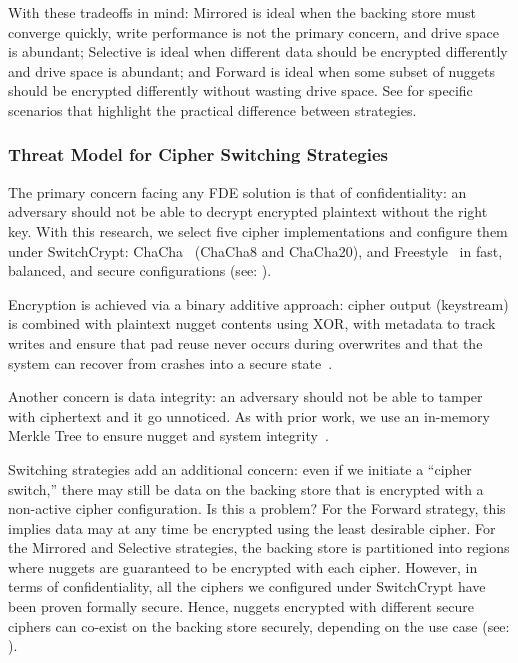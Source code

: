 With these tradeoffs in mind: Mirrored is ideal when the backing store must
converge quickly, write performance is not the primary concern, and drive space
is abundant; Selective is ideal when different data should be encrypted
differently and drive space is abundant; and Forward is ideal when some subset
of nuggets should be encrypted differently without wasting drive space. See
 for specific scenarios that highlight the practical difference
between strategies.

\subsubsection{Threat Model for Cipher Switching Strategies}

The primary concern facing any FDE solution is that of confidentiality: an
adversary should not be able to decrypt encrypted plaintext without the right
key. With this research, we select five cipher implementations and configure
them under SwitchCrypt: ChaCha~\cite{ChaCha20} (ChaCha8 and ChaCha20), and
Freestyle~\cite{Freestyle} in fast, balanced, and secure configurations (see:
).

Encryption is achieved via a binary additive approach: cipher output (keystream)
is combined with plaintext nugget contents using XOR, with metadata to track
writes and ensure that pad reuse never occurs during overwrites and that the
system can recover from crashes into a secure state~\cite{StrongBox}.

Another concern is data integrity: an adversary should not be able to tamper
with ciphertext and it go unnoticed. As with prior work, we use an in-memory
Merkle Tree to ensure nugget and system integrity~\cite{StrongBox}.

Switching strategies add an additional concern: even if we initiate a ``cipher
switch,'' there may still be data on the backing store that is encrypted with a
non-active cipher configuration. Is this a problem? For the Forward strategy,
this implies data may at any time be encrypted using the least desirable cipher.
For the Mirrored and Selective strategies, the backing store is partitioned into
regions where nuggets are guaranteed to be encrypted with each cipher. However,
in terms of confidentiality, all the ciphers we configured under SwitchCrypt
have been proven formally secure. Hence, nuggets encrypted with different secure
ciphers can co-exist on the backing store securely, depending on the use case
(see: ).

